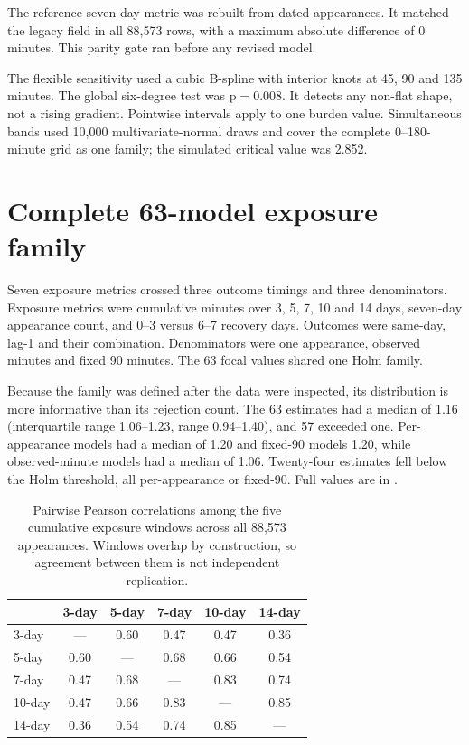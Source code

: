 \documentclass[11pt]{article}
\newcommand{\pval}{\mathrm{p}}
\begin{document}
The reference seven-day metric was rebuilt from dated appearances. It matched the legacy field in all 88,573 rows, with a maximum absolute difference of 0 minutes. This parity gate ran before any revised model.

The flexible sensitivity used a cubic B-spline with interior knots at 45, 90 and 135 minutes. The global six-degree test was $\pval=0.008$. It detects any non-flat shape, not a rising gradient. Pointwise intervals apply to one burden value. Simultaneous bands used 10,000 multivariate-normal draws and cover the complete 0--180-minute grid as one family; the simulated critical value was 2.852.

\section{Complete 63-model exposure family}

Seven exposure metrics crossed three outcome timings and three denominators. Exposure metrics were cumulative minutes over 3, 5, 7, 10 and 14 days, seven-day appearance count, and 0--3 versus 6--7 recovery days. Outcomes were same-day, lag-1 and their combination. Denominators were one appearance, observed minutes and fixed 90 minutes. The 63 focal values shared one Holm family.

Because the family was defined after the data were inspected, its distribution is more informative than its rejection count. The 63 estimates had a median of 1.16 (interquartile range 1.06--1.23, range 0.94--1.40), and 57 exceeded one. Per-appearance models had a median of 1.20 and fixed-90 models 1.20, while observed-minute models had a median of 1.06. Twenty-four estimates fell below the Holm threshold, all per-appearance or fixed-90. Full values are in .

\begin{table}[h]
\centering
\caption{Pairwise Pearson correlations among the five cumulative exposure windows across all 88,573 appearances. Windows overlap by construction, so agreement between them is not independent replication.}
\label{tab:supp_correlations}
\small
\begin{tabular}{lccccc}
\toprule
 & 3-day & 5-day & 7-day & 10-day & 14-day\\
\midrule
3-day & --- & 0.60 & 0.47 & 0.47 & 0.36\\
5-day & 0.60 & --- & 0.68 & 0.66 & 0.54\\
7-day & 0.47 & 0.68 & --- & 0.83 & 0.74\\
10-day & 0.47 & 0.66 & 0.83 & --- & 0.85\\
14-day & 0.36 & 0.54 & 0.74 & 0.85 & ---\\
\bottomrule
\end{tabular}
\end{table}
\end{document}
